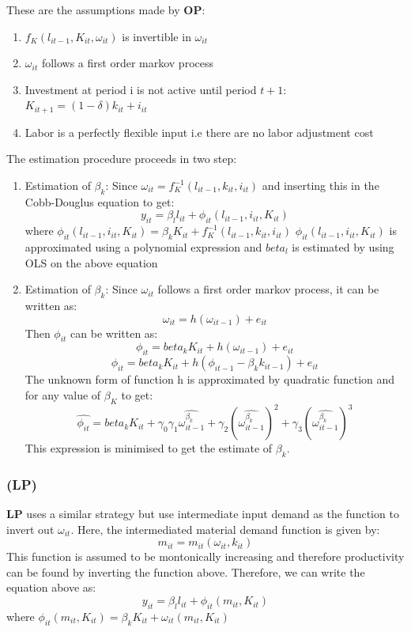 \documentclass[11pt]{article}
\begin{document}
These are the assumptions made by \textbf{OP}:
\begin{enumerate}
\item $f_{K}(l_{it-1}, K_{it}, \omega_{it})$ is invertible in
  $\omega_{it}$
\item $\omega_{it}$ follows a first order markov process 
\item Investment at period i is not active until period $t+1$:
  $K_{it+1}= (1-\delta)k_{it} + i_{it}$
\item Labor is a perfectly flexible input i.e there are no labor
  adjustment cost
\end{enumerate}

The estimation procedure proceeds in two step:
\begin{enumerate}
\item Estimation of $\beta_{k}$:
Since $\omega_{it}=f_{K}^{-1}(l_{it-1},k_{it},i_{it})$ and inserting
this in the Cobb-Douglus equation to get: 
$$ y_{it} = \beta_{l}l_{it} + \phi_{it}(l_{it-1},i_{it},K_{it})$$
where $\phi_{it}(l_{it-1},i_{it},K_{it}) =  \beta_{k}K_{it}+ f_{K}^{-1}(l_{it-1},k_{it},i_{it})$
$\phi_{it}(l_{it-1},i_{it},K_{it})$ is approximated using a polynomial
expression and $beta_{l}$ is estimated by using OLS on the above
equation
\item Estimation of $\beta_{k}$:
Since $\omega_{it}$ follows a first order markov process, it can be
written as: 
$$ \omega_{it} = h(\omega_{it-1}) + e_{it}$$
Then $\phi_{it}$ can be written as: 
$$ \phi_{it} = beta_{k}K_{it} + h(\omega_{it-1}) + e_{it}$$
$$ \phi_{it} = beta_{k}K_{it} + h(\phi_{it-1}- \beta_{k}k_{it-1}) + e_{it}$$
The unknown form of function h is approximated by quadratic function
and for any value of $\beta_K$ to get:
$$ \hat{\phi_{it}} = beta_{k}K_{it} +\gamma_{0}
\gamma_{1}\hat{\omega_{it-1}^{\beta_{k}}}+
\gamma_{2}(\hat{\omega_{it-1}^{\beta_{k}}})^{2}
+ \gamma_{3}(\hat{\omega_{it-1}^{\beta_{k}}})^{3} $$
 This expression is minimised to get the estimate of $\beta_{k}$. 
\end{enumerate}
\subsubsection{\cite{levinsohn2003estimating} (LP)}
\cite{levinsohn2003estimating} \textbf{LP} uses a similar strategy but use intermediate input demand
as the function to invert out $\omega_{it}$. 
Here, the intermediated material demand function is given by:
$$  m_{it} = m_{it}(\omega_{it}, k_{it})$$
This function is assumed to be montonically increasing and therefore
productivity can be found by inverting the function above. Therefore,
we can write the equation above as: 
$$ y_{it} = \beta_{l}l_{it} + \phi_{it}(m_{it},K_{it})$$
where $\phi_{it}(m_{it},K_{it}) =  \beta_{k}K_{it}+ \omega_{it}(m_{it}, K_{it})$
\end{document}
